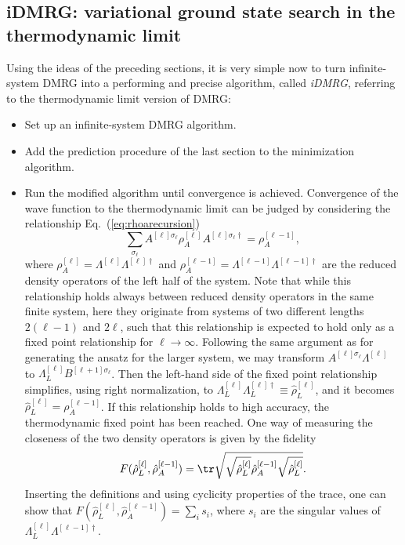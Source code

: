 \subsection{iDMRG: variational ground state search in the thermodynamic limit}
Using the ideas of the preceding sections, it is very simple now to turn infinite-system DMRG into a performing and precise algorithm, called {\em iDMRG}, referring to the thermodynamic limit version of DMRG:
\begin{itemize}
\item Set up an infinite-system DMRG algorithm.
\item Add the prediction procedure of the last section to the minimization algorithm.
\item Run the modified algorithm until convergence is achieved. Convergence of the wave function
to the thermodynamic limit can be judged by considering the relationship Eq.~(\ref{eq:rhoarecursion})
\begin{equation}
\sum_{\sigma_\ell} A^{[\ell]\sigma_\ell} \rho_A^{[\ell]} A^{[\ell]\sigma_\ell\dagger} = \rho_A^{[\ell-1]} ,
\end{equation}
where $\rho_A^{[\ell]} = \Lambda^{[\ell]}\Lambda^{[\ell]\dagger}$ and $\rho_A^{[\ell-1]} = \Lambda^{[\ell-1]}\Lambda^{[\ell-1]\dagger}$ are the reduced density operators of the left half of the system. Note that while this relationship holds always between reduced density operators in the same finite system, here they originate from systems of two different lengths $2(\ell-1)$ and $2\ell$, such that this relationship is expected to hold only as a fixed point relationship for $\ell\rightarrow\infty$. Following the same argument as for generating the ansatz for the larger system, we may transform $A^{[\ell]\sigma_\ell}\Lambda^{[\ell]}$ to $\Lambda^{[\ell]}_L B^{[\ell+1]\sigma_\ell}$. Then the left-hand side of the fixed point relationship simplifies, using right normalization, to $\Lambda^{[\ell]}_L\Lambda^{[\ell]\dagger}_L \equiv \hat{\rho}^{[\ell]}_L$, and it becomes $\hat{\rho}^{[\ell]}_L = \rho_A^{[\ell-1]}$. If this relationship holds to high accuracy, the thermodynamic fixed point has been reached.  
One way of measuring the closeness of the two density operators is given by the fidelity \cite{McCulloch08}
\begin{equation}
F(\hat{\rho}^{[\ell]}_L, \hat{\rho}_A^{[\ell-1]}) = \tr \sqrt{\sqrt{\hat{\rho}^{[\ell]}_L}\hat{\rho}_A^{[\ell-1]} \sqrt{\hat{\rho}^{[\ell]}_L}} .
\end{equation}
Inserting the definitions and using cyclicity properties of the trace, one can show that $F(\hat{\rho}^{[\ell]}_L, \hat{\rho}^{[\ell-1]}_A) = \sum_i s_i$, where $s_i$ are the singular values of  $\Lambda^{[\ell]}_L \Lambda^{[\ell-1]\dagger}$. 
\end{itemize}
